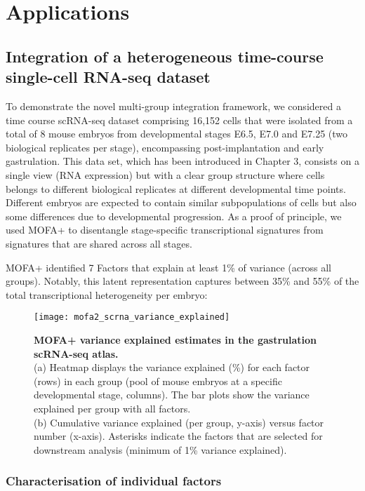 \section{Applications}

\subsection{Integration of a heterogeneous time-course single-cell RNA-seq dataset}

To demonstrate the novel multi-group integration framework, we considered a time course scRNA-seq dataset comprising 16,152 cells that were isolated from a total of 8 mouse embryos from developmental stages E6.5, E7.0 and E7.25 (two biological replicates per stage), encompassing post-implantation and early gastrulation\cite{Pijuan-Sala2019}. This data set, which has been introduced in Chapter 3, consists on a single view (RNA expression) but with a clear group structure where cells belongs to different biological replicates at different developmental time points. Different embryos are expected to contain similar subpopulations of cells but also some differences due to developmental progression. As a proof of principle, we used MOFA+ to disentangle stage-specific transcriptional signatures from signatures that are shared across all stages. 

MOFA+ identified 7 Factors that explain at least 1\% of variance (across all groups). Notably, this latent representation captures between 35\% and 55\% of the total transcriptional heterogeneity per embryo:

\begin{figure}[H]
	\centering
	\texttt{[image: mofa2\_scrna\_variance\_explained]}
	\caption[]{
	\textbf{MOFA+ variance explained estimates in the gastrulation scRNA-seq atlas.} \\
	(a) Heatmap displays the variance explained (\%) for each factor (rows) in each group (pool of mouse embryos at a specific developmental stage, columns). The bar plots show the variance explained per group with all factors. \\
	(b) Cumulative variance explained (per group, y-axis) versus factor number (x-axis). Asterisks indicate the factors that are selected for downstream analysis (minimum of 1\% variance explained).
	}
	\label{fig:mofa2_scrna_variance_explained}
\end{figure}


\subsubsection{Characterisation of individual factors}

